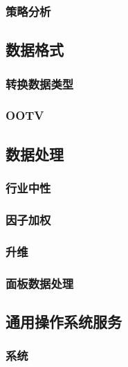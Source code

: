 \documentclass[11pt]{article}
\begin{document}
\subsubsection{策略分析}
\label{sec:orgheadline122}

\subsection{数据格式}
\label{sec:orgheadline126}

\subsubsection{转换数据类型}
\label{sec:orgheadline124}

\subsubsection{OOTV}
\label{sec:orgheadline125}
\subsection{数据处理}
\label{sec:orgheadline131}

\subsubsection{行业中性}
\label{sec:orgheadline127}

\subsubsection{因子加权}
\label{sec:orgheadline128}

\subsubsection{升维}
\label{sec:orgheadline129}

\subsubsection{面板数据处理}
\label{sec:orgheadline130}
\subsection{通用操作系统服务}
\label{sec:orgheadline136}

\subsubsection{系统}
\label{sec:orgheadline132}
\end{document}
